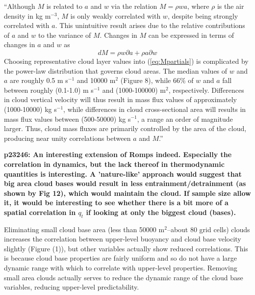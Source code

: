 \documentclass[12pt]{article}
\begin{document}
``Although $M$ is related to $a$ and $w$ via the relation $M = \rho w a$, where 
$\rho$ is the air density in kg m$^{-3}$, $M$ is only weakly correlated with 
$w$, despite being strongly correlated with $a$.  This unintuitive result 
arises due to the relative contributions of $a$ and $w$ to the variance of $M$.
Changes in $M$ can be expressed in terms of changes in $a$ and $w$ as
\begin{equation}
\label{eq:Mpartials}
d M = \rho w \partial {a} + \rho a \partial {w}
\end{equation}
Choosing representative cloud layer values into (\ref{eq:Mpartials}) is 
complicated by the power-law distribution that governs cloud areas.  The median 
values of $w$ and $a$ are roughly 0.5 m s$^{-1}$ and 10000 m$^2$ (Figure 8), 
while 66\% of $w$ and $a$ fall between roughly (0.1-1.0) m s$^{-1}$ and
(1000-100000) m$^{2}$, respectively.  Differences in cloud vertical velocity 
will thus result in mass flux values of approximately (1000-10000) kg s$^{-1}$, 
while differences in cloud cross-sectional area will results in mass flux 
values between (500-50000) kg s$^{-1}$, a range an order of magnitude larger.  
Thus, cloud mass fluxes are primarily controlled by the area of the cloud, 
producing near unity correlations between $a$ and $M$.''

\vspace{5mm}

\textbf{p23246: An interesting extension of Romps indeed. Especially the 
correlation in dynamics, but the lack thereof in thermodynamic quantities is
interesting. A 'nature-like' approach would suggest that big area cloud bases 
would result in less entrainment/detrainment (as shown by Fig 12), which would
maintain the cloud. If sample size allow it, it would be interesting to see 
whether there is a bit more of a spatial correlation in $q_t$ if looking at 
only the biggest cloud (bases).}

\vspace{5mm}

Eliminating small cloud base area (less than 50000 m$^2$--about 80 grid cells) 
clouds increases the correlation between upper-level buoyancy and cloud base 
velocity slightly (Figure (1)), but other variables actually show reduced 
correlations.  This is because cloud base properties are fairly uniform and so 
do not have a large dynamic range with which to correlate with upper-level 
properties.  Removing small area clouds actually serves to reduce the dynamic 
range of the cloud base variables, reducing upper-level predictability.
\end{document}
